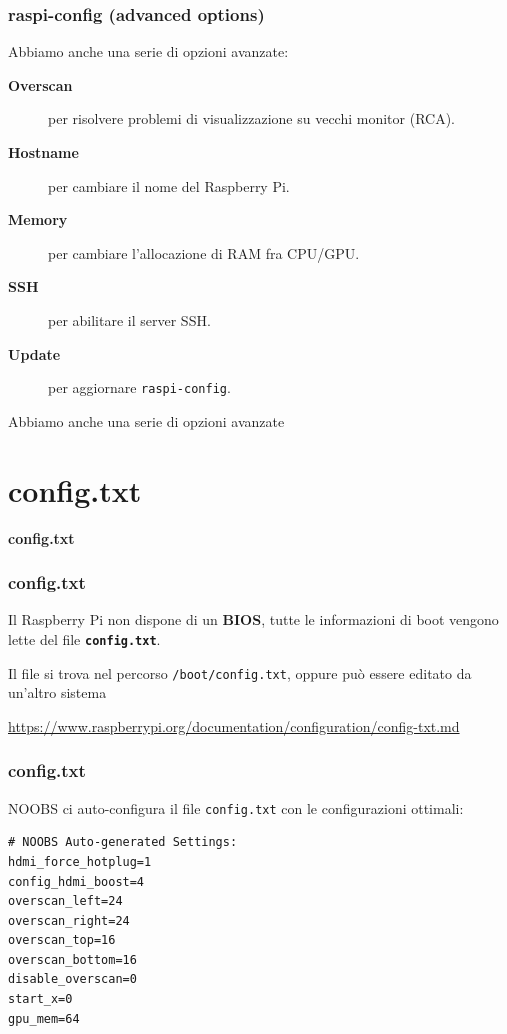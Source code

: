 \documentclass[xcolor=svgnames,11pt]{beamer}
\begin{document}
\begin{frame}\frametitle{raspi-config (advanced options)}
Abbiamo anche una serie di opzioni avanzate:
\begin{description}
  \item[\textbf{Overscan}] per risolvere problemi di visualizzazione su vecchi monitor (RCA).
  \item[\textbf{Hostname}] per cambiare il nome del Raspberry Pi.
  \item[\textbf{Memory}] per cambiare l'allocazione di RAM fra CPU/GPU.
  \item[\textbf{SSH}] per abilitare il server SSH.
  \item[\textbf{Update}] per aggiornare \texttt{raspi-config}.
\end{description}
\medskip
Abbiamo anche una serie di opzioni avanzate
\end{frame}

\section{config.txt}
\begin{frame}{}
\begin{center}
\begin{Huge}
{\color{green_raspi} \textbf{config.txt}}
\end{Huge}
\end{center}
\end{frame}

\begin{frame}\frametitle{config.txt}
Il Raspberry Pi non dispone di un \textbf{BIOS}, tutte le informazioni di boot vengono lette del file \texttt{\textbf{config.txt}}.

\medskip
\pause

Il file si trova nel percorso \texttt{/boot/config.txt}, oppure pu\`o essere editato da un'altro sistema 

\medskip
\pause
\begin{small}
\url{https://www.raspberrypi.org/documentation/configuration/config-txt.md}  
\end{small}
\end{frame}

\begin{frame}[fragile]\frametitle{config.txt}
NOOBS ci auto-configura il file \texttt{config.txt} con le configurazioni ottimali:

\medskip
\pause
\begin{verbatim}
# NOOBS Auto-generated Settings:
hdmi_force_hotplug=1
config_hdmi_boost=4
overscan_left=24
overscan_right=24
overscan_top=16
overscan_bottom=16
disable_overscan=0
start_x=0
gpu_mem=64
\end{verbatim}
\end{frame}
\end{document}

